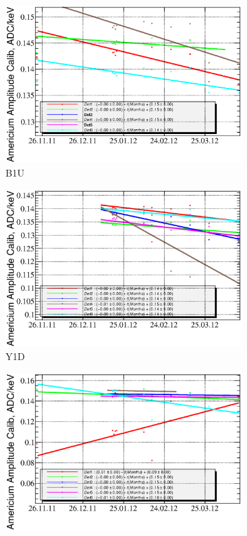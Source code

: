 \documentclass[a4paper,12pt]{article}
\begin{document}
\begin{figure}[h]
\begin{subfigure}[b]{0.5\textwidth}
\includegraphics[width=\textwidth]{gfx/run12_alpha/B1U/c_chAmGain_by_day_B1U.eps}
\caption{B1U}
\end{subfigure}
\begin{subfigure}[b]{0.5\textwidth}
\includegraphics[width=\textwidth]{gfx/run12_alpha/Y1D/c_chAmGain_by_day_Y1D.eps}
\caption{Y1D}
\end{subfigure}
%
\begin{subfigure}[b]{0.5\textwidth}
\includegraphics[width=\textwidth]{gfx/run12_alpha/B2D/c_chAmGain_by_day_B2D.eps}

\end{subfigure}
\end{figure}
\end{document}
